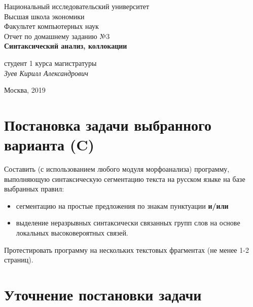 \documentclass[oneside,final,12pt]{article}
\begin{document}
\begin{titlepage}
\begin{center}

    Национальный исследовательский университет\\
    Высшая школа экономики\\
    Факультет компьютерных наук\\[60mm]
    \bigskip
    Отчет по домашнему заданию №3 \\[5mm]   
    \textsf{\large\bfseries
        Синтаксический анализ, коллокации
    }\\[50mm]

   
    \begin{flushright}
        \parbox{0.4\textwidth}{
            студент 1 курса магистратуры\\
            \emph{Зуев Кирилл Александрович}\\[5mm]
        }
    \end{flushright}

    \vspace{\fill}
    Москва, 2019
\end{center}
\end{titlepage}

\newpage

\renewcommand{\contentsname}{Содержание}
\tableofcontents

\newpage

\section{Постановка задачи выбранного варианта (C)}

Составить (с использованием любого модуля морфоанализа) программу, выполняющую синтаксическую сегментацию текста на русском языке на базе выбранных правил:

\begin{itemize}
	\item сегментацию на простые предложения по знакам пунктуации \textbf{и/или}
	\item выделение неразрывных синтаксически связанных групп слов на основе локальных высоковероятных связей.
\end{itemize}

Протестировать программу на нескольких текстовых фрагментах (не менее 1-2 страниц).

\section{Уточнение постановки задачи}
\end{document}
